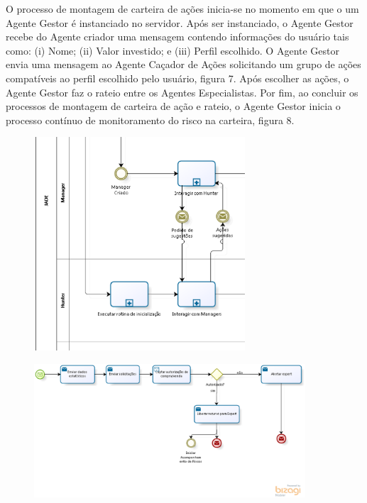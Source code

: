 \begin{apendicesenv}
\begin{itemize}
	O processo de montagem de carteira de ações inicia-se no momento em que o um Agente Gestor é instanciado no servidor. Após ser instanciado, o Agente Gestor recebe do Agente criador uma mensagem contendo informações do usuário tais como: (i) Nome; (ii) Valor investido; e (iii) Perfil escolhido. O Agente Gestor envia uma mensagem ao Agente Caçador de Ações solicitando um grupo de ações compatíveis ao perfil escolhido pelo usuário, figura 7. Após escolher as ações, o Agente Gestor faz o rateio entre os Agentes Especialistas. Por fim, ao concluir os processos de montagem de carteira de ação e rateio, o Agente Gestor inicia o processo contínuo de monitoramento do risco na carteira, figura 8.



\begin{figure}[h]
\centering
\label{f6}
\includegraphics[width=0.7\textwidth]{figuras/f31}
\end{figure}

\begin{figure}[h]
\centering
\label{f7}
\includegraphics[width=0.9\textwidth]{figuras/f34}
\end{figure}



\end{itemize}
\end{apendicesenv}
